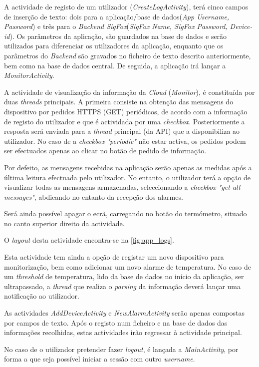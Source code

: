 \documentclass[a4paper]{article}
\begin{document}
A actividade de registo de um utilizador (\textit{CreateLogActivity}), terá cinco campos de inserção de texto: dois para a aplicação/base de dados(\textit{App Username, Password}) e três para o \textit{Backend SigFox}(\textit{SigFox Name, SigFox Password, Device-id}). Os parâmetros da aplicação, são guardados na base de dados e serão utilizados para diferenciar os utilizadores da aplicação, enquanto que os parâmetros do \textit{Backend} são gravados no ficheiro de texto descrito anteriormente, bem como na base de dados central. De seguida, a aplicação irá lançar a \textit{MonitorActivity}.

A actividade de visualização da informação da \textit{Cloud} (\textit{Monitor}), é constituída por duas \textit{threads} principais. A primeira consiste na obtenção das mensagens do dispositivo por pedidos HTTPS (GET) periódicos, de acordo com a informação de registo do utilizador e que é actividada por uma \textit{checkbox}. Posteriormente a resposta será enviada para a \textit{thread} principal (da API) que a disponibiliza ao utilizador. No caso de a \textit{checkbox "periodic"} não estar activa, os pedidos podem ser efectuados apenas ao clicar no botão de pedido de informação.

Por defeito, as mensagens recebidas na aplicação serão apenas as medidas após a última leitura efectuada pelo utilizador. No entanto, o utilizador terá a opção de visualizar todas as mensagens armazenadas, seleccionando a \textit{checkbox "get all messages"}, abdicando no entanto da recepção dos alarmes. 

Será ainda possível apagar o ecrã, carregando no botão do termómetro, situado no canto superior direito da actividade.

 O \textit{layout} desta actividade encontra-se na \autoref{fig:app_logs}.

Esta actividade tem ainda a opção de registar um novo dispositivo para monitorização, bem como adicionar um novo alarme de temperatura. No caso de um \textit{threshold} de temperatura, lido da base de dados no início da aplicação, ser ultrapassado, a \textit{thread} que realiza o \textit{parsing} da informação deverá lançar uma notificação ao utilizador.

As actividades \textit{AddDeviceActivity} e \textit{NewAlarmActivity} serão apenas compostas por campos de texto. Após o registo num ficheiro e na base de dados das informações recolhidas, estas actividades irão regressar à actividade principal.

No caso de o utilizador pretender fazer \textit{logout}, é lançada a \textit{MainActivity}, por forma a que seja possível iniciar a sessão com outro \textit{username}.
\end{document}
